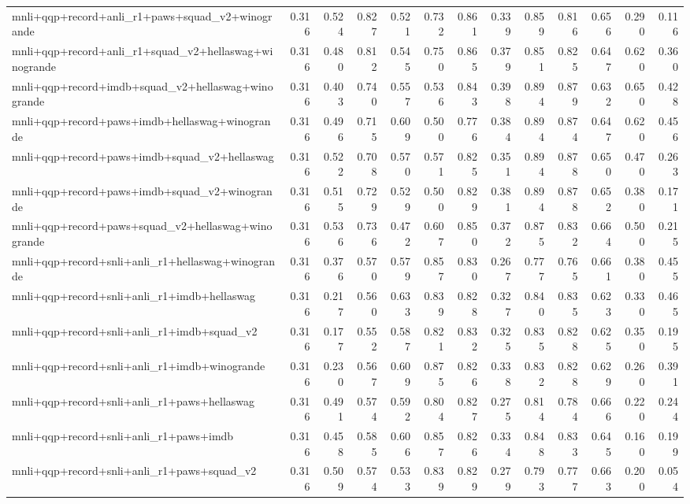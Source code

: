 \begin{table}[t]
\begin{tabular}{lrrrrrrrrrrrr}
    mnli+qqp+record+anli\_r1+paws+squad\_v2+winogrande & 0.316 & 0.524 & 0.827 & 0.521 & 0.732 & 0.861 & 0.339 & 0.859 & 0.816 & 0.656 & 0.290 & 0.116 \\
    mnli+qqp+record+anli\_r1+squad\_v2+hellaswag+winogrande & 0.316 & 0.480 & 0.812 & 0.545 & 0.750 & 0.865 & 0.379 & 0.851 & 0.825 & 0.647 & 0.620 & 0.360 \\
    mnli+qqp+record+imdb+squad\_v2+hellaswag+winogrande & 0.316 & 0.403 & 0.740 & 0.557 & 0.536 & 0.843 & 0.398 & 0.894 & 0.879 & 0.632 & 0.650 & 0.428 \\
    mnli+qqp+record+paws+imdb+hellaswag+winogrande & 0.316 & 0.496 & 0.715 & 0.609 & 0.500 & 0.776 & 0.384 & 0.894 & 0.874 & 0.647 & 0.620 & 0.456 \\
    mnli+qqp+record+paws+imdb+squad\_v2+hellaswag & 0.316 & 0.522 & 0.708 & 0.570 & 0.571 & 0.825 & 0.351 & 0.894 & 0.878 & 0.650 & 0.470 & 0.263 \\
    mnli+qqp+record+paws+imdb+squad\_v2+winogrande & 0.316 & 0.515 & 0.729 & 0.529 & 0.500 & 0.829 & 0.381 & 0.894 & 0.878 & 0.652 & 0.380 & 0.171 \\
    mnli+qqp+record+paws+squad\_v2+hellaswag+winogrande & 0.316 & 0.536 & 0.736 & 0.472 & 0.607 & 0.850 & 0.372 & 0.875 & 0.832 & 0.664 & 0.500 & 0.215 \\
    mnli+qqp+record+snli+anli\_r1+hellaswag+winogrande & 0.316 & 0.376 & 0.570 & 0.579 & 0.857 & 0.830 & 0.267 & 0.777 & 0.765 & 0.661 & 0.380 & 0.455 \\
    mnli+qqp+record+snli+anli\_r1+imdb+hellaswag & 0.316 & 0.217 & 0.560 & 0.633 & 0.839 & 0.828 & 0.327 & 0.840 & 0.835 & 0.623 & 0.330 & 0.465 \\
    mnli+qqp+record+snli+anli\_r1+imdb+squad\_v2 & 0.316 & 0.177 & 0.552 & 0.587 & 0.821 & 0.832 & 0.325 & 0.835 & 0.828 & 0.625 & 0.350 & 0.195 \\
    mnli+qqp+record+snli+anli\_r1+imdb+winogrande & 0.316 & 0.230 & 0.567 & 0.609 & 0.875 & 0.826 & 0.338 & 0.832 & 0.828 & 0.629 & 0.260 & 0.391 \\
    mnli+qqp+record+snli+anli\_r1+paws+hellaswag & 0.316 & 0.491 & 0.574 & 0.592 & 0.804 & 0.827 & 0.275 & 0.814 & 0.784 & 0.666 & 0.220 & 0.244 \\
    mnli+qqp+record+snli+anli\_r1+paws+imdb & 0.316 & 0.458 & 0.585 & 0.606 & 0.857 & 0.826 & 0.334 & 0.848 & 0.833 & 0.645 & 0.160 & 0.199 \\
    mnli+qqp+record+snli+anli\_r1+paws+squad\_v2 & 0.316 & 0.509 & 0.574 & 0.533 & 0.839 & 0.829 & 0.279 & 0.793 & 0.777 & 0.663 & 0.200 & 0.054 \\

\end{tabular}
\end{table}
